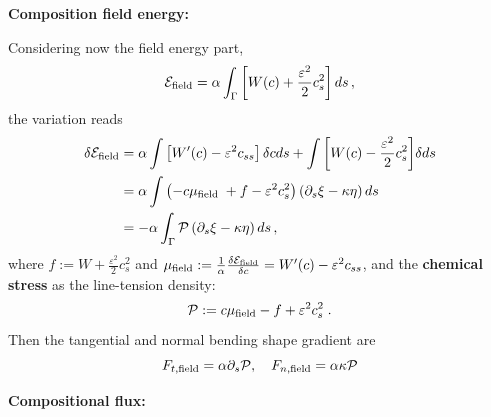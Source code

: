 \documentclass[
aip,
jcp,
reprint, 
floatfix
]{revtex4-1}
\begin{document}
{\bf Composition field energy:}

Considering now the field energy part, 
\begin{equation}
    \mathcal{E}_{\rm field}=\alpha \int_{\Gamma}\left[W(c)+\frac{\varepsilon^2}{2} c_s^2\right] d s \,,
\end{equation}
the variation reads
\begin{equation}
    \begin{aligned}
        \delta {{\cal E}_{{\rm{field}}}} 
 &=\alpha \int {\left[ {{W^\prime }(c) - {\varepsilon ^2}{c_{ss}}} \right]\delta cds}  + \int {\left[ {W(c) - \frac{{{\varepsilon ^2}}}{2}c_s^2} \right]} \delta ds\\
 &= \alpha\int\left(-c \mu_{\text {field }}+f-\varepsilon^2 c_s^2\right)\left(\partial_s \xi-\kappa \eta\right) d s\\
 &= -\alpha \int_{\Gamma}\mathcal{P}\left(\partial_s \xi-\kappa \eta\right) d s\,,
    \end{aligned}
\end{equation}
where $f:=W+\frac{\varepsilon^2}{2} c_s^2$ and $\mu_{\rm field}:=\frac{1}{\alpha} \frac{\delta \mathcal{E}_{\rm field}}{ \delta c}=W^{\prime}(c)-\varepsilon^2 c_{s s}$, and the \textbf{chemical stress} as the line-tension density:
\begin{equation}
    \mathcal{P}:=c \mu_{\rm field} - f +\varepsilon^2 c_s^2\; .
\end{equation}
Then the tangential and normal bending shape gradient are 
\begin{equation}\label{eq: field_gradient}
    F_{t, {\rm field}}=\alpha \partial_s \mathcal{P}, \quad F_{n, {\rm field}}=\alpha\kappa\mathcal{P}
\end{equation}

{\bf Compositional flux:}
\end{document}

